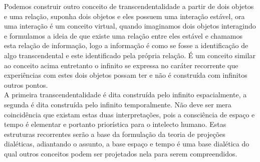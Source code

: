 \documentclass[10pt,a4paper]{report}
\begin{document}
Podemos construir outro conceito de transcendentalidade a partir de dois objetos e uma relação, suponha dois objetos e eles possuem uma interação estável, ora uma interação é um conceito virtual, quando imaginamos dois objetos interagindo e formulamos a ideia de que existe uma relação entre eles estável e chamamos esta relação de informação, logo a informação é como se fosse a identificação de algo transcendental e este identificado pela própria relação. É um conceito similar ao conceito acima entretanto o infinito se expressa no caráter recorrente que experiências com estes dois objetos possam ter e não é construída com infinitos outros pontos.\\

A primeira transcendentalidade é dita construída pelo infinito espacialmente, a segunda é dita construída pelo infinito temporalmente. Não deve ser mera coincidência que existam estas duas interpretações, pois a consciência de espaço e tempo é elementar e portanto priorística para o intelecto humano. Estas estruturas recorrentes serão a base da formulação da teoria de projeções dialéticas, adiantando o assunto, a base espaço e tempo é uma base dialética do qual outros conceitos podem ser projetados nela para serem compreendidos.












\end{document}
